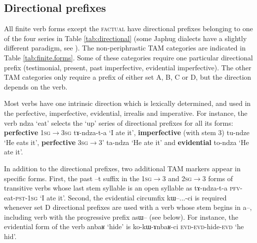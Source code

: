 \documentclass[oldfontcommands,oneside,a4paper,11pt]{article}
\newcommand{\ipa}[1]{{\phon #1}} %
\begin{document}
\subsection{Directional prefixes}
All finite verb forms except the \textsc{factual} have directional prefixes belonging to one of the four series in Table \ref{tab:directional} (some Japhug dialects have a slightly different paradigm, see \citealt{linluo03}). The non-periphrastic TAM categories are indicated in Table \ref{tab:finite.forms}. Some of these categories require one particular directional prefix (testimonial, present, past imperfective, evidential imperfective). The other TAM categories only require a prefix of either set A, B, C or D, but the direction depends on the verb.

Most verbs have one intrinsic direction which is lexically determined, and used in the perfective, imperfective, evidential, irrealis and imperative. For instance, the verb \ipa{ndza} `eat' selects the `up' series of directional prefixes for all its forms: \textbf{perfective} \textsc{1sg$\rightarrow$3sg} \ipa{tɤ-ndza-t-a} `I ate it', \textbf{imperfective} (with stem 3) \ipa{tu-ndze} `He eats it', \textbf{perfective} \textsc{3sg$\rightarrow$3'} \ipa{ta-ndza} `He ate it' and \textbf{evidential} \ipa{to-ndza} `He ate it'. 

In addition to the directional prefixes, two additional TAM markers appear in specific forms. First, the past \ipa{--t} suffix in the \textsc{1sg}$\rightarrow$3 and \textsc{2sg}$\rightarrow$3 forms of transitive verbs whose last stem syllable is an open syllable as \ipa{tɤ-ndza-t-a} \textsc{pfv}-eat-\textsc{pst-1sg} `I ate it'. Second, the evidential circumfix \ipa{kɯ--...-ci} is required whenever set D directional prefixes are used with a verb whose stem begins in \ipa{a--}, including verb with the progressive prefix \ipa{asɯ--} (see below). For instance, the evidential form of the verb \ipa{anbaʁ} `hide' is \ipa{ko-kɯ-ɤnbaʁ-ci} \textsc{evd-evd}-hide-\textsc{evd} `he hid'.
\end{document}
